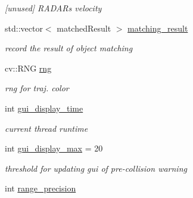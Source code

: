 \begin{DoxyCompactItemize}
\begin{DoxyCompactList}\small\item\em \mbox{[}unused\mbox{]} R\+A\+D\+A\+R\textquotesingle{}s velocity \end{DoxyCompactList}\item 
\hypertarget{class_sensor_info_abf45d1d44c8c514ac08436fd3cb49e20}{}std\+::vector$<$ matched\+Result $>$ \hyperlink{class_sensor_info_abf45d1d44c8c514ac08436fd3cb49e20}{matching\+\_\+result}\label{class_sensor_info_abf45d1d44c8c514ac08436fd3cb49e20}

\begin{DoxyCompactList}\small\item\em record the result of object matching \end{DoxyCompactList}\item 
\hypertarget{class_sensor_info_a40a4baa34f55a59904e324b650a554d9}{}cv\+::\+R\+N\+G \hyperlink{class_sensor_info_a40a4baa34f55a59904e324b650a554d9}{rng}\label{class_sensor_info_a40a4baa34f55a59904e324b650a554d9}

\begin{DoxyCompactList}\small\item\em rng for traj. color \end{DoxyCompactList}\item 
\hypertarget{class_sensor_info_ae99e7853a9994afa0006104d7dffe52c}{}int \hyperlink{class_sensor_info_ae99e7853a9994afa0006104d7dffe52c}{gui\+\_\+display\+\_\+time}\label{class_sensor_info_ae99e7853a9994afa0006104d7dffe52c}

\begin{DoxyCompactList}\small\item\em current thread runtime \end{DoxyCompactList}\item 
\hypertarget{class_sensor_info_a9129c44c0a6ee9f0cae8225faad27907}{}int \hyperlink{class_sensor_info_a9129c44c0a6ee9f0cae8225faad27907}{gui\+\_\+display\+\_\+max} = 20\label{class_sensor_info_a9129c44c0a6ee9f0cae8225faad27907}

\begin{DoxyCompactList}\small\item\em threshold for updating gui of pre-\/collision warning \end{DoxyCompactList}\item 
\hypertarget{class_sensor_info_a0173834b9d6c50ab6bca8c275123ed20}{}int \hyperlink{class_sensor_info_a0173834b9d6c50ab6bca8c275123ed20}{range\+\_\+precision}\label{class_sensor_info_a0173834b9d6c50ab6bca8c275123ed20}


\end{DoxyCompactItemize}
